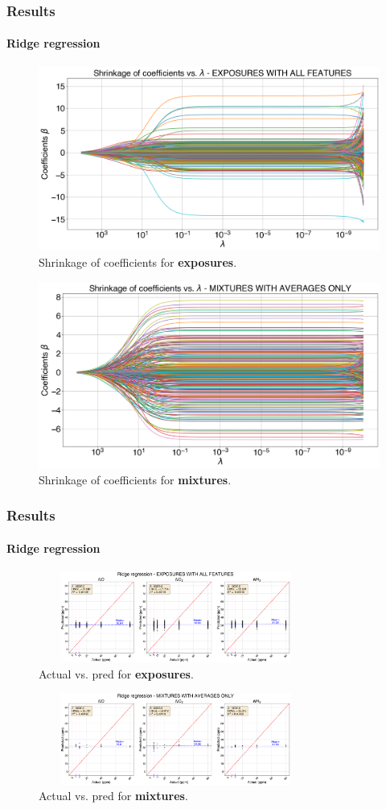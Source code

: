 \documentclass{beamer}
\begin{document}
\begin{frame}
	\frametitle{Results}
	\framesubtitle{Ridge regression}
	
		\begin{figure}
		\includegraphics[width=0.5\linewidth]{../../figures/ridge-shrink.png}
		\caption{Shrinkage of coefficients for \textbf{exposures}.}
	\end{figure}
	
	\begin{figure}
		\includegraphics[width=0.5\linewidth]{../../figures/ridge-shrink-avg-feat.png}
		\caption{Shrinkage of coefficients for \textbf{mixtures}.}
	\end{figure}
	
\end{frame}

\begin{frame}
	\frametitle{Results}
	\framesubtitle{Ridge regression}
	
		\begin{figure}
		\includegraphics[width=0.8\textwidth, height = 3cm, keepaspectratio]{../../figures/ridge-act-vs-pred.png}
		\caption{Actual vs. pred for \textbf{exposures}.}
	\end{figure}
	
	\begin{figure}
		\includegraphics[width=0.8\textwidth, height = 3cm, keepaspectratio]{../../figures/ridge-act-vs-pred-avg-feat.png}
		\caption{Actual vs. pred for \textbf{mixtures}.}
	\end{figure}

\end{frame}
\end{document}
